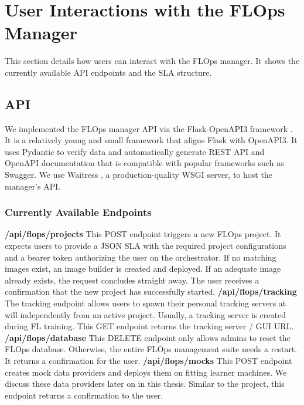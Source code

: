 \section{User Interactions with the FLOps Manager}
This section details how users can interact with the FLOps manager.
It shows the currently available API endpoints and the SLA structure.

\subsection{API} \label{subsection:api}
We implemented the FLOps manager API via the Flask-OpenAPI3 framework \cite{framework:flask_openapi3}.
It is a relatively young and small framework that aligns Flask with OpenAPI3.
It uses Pydantic to verify data and automatically generate REST API and OpenAPI documentation that is compatible with popular frameworks such as Swagger.
We use Waitress \cite{waitress}, a production-quality WSGI server, to host the manager's API.

\subsubsection{Currently Available Endpoints}
\textbf{/api/flops/projects}\newline
This POST endpoint triggers a new FLOps project.
It expects users to provide a JSON SLA with the required project configurations and a bearer token authorizing the user on the orchestrator.
If no matching images exist, an image builder is created and deployed.
If an adequate image already exists, the request concludes straight away.
The user receives a confirmation that the new project has successfully started.
\vspace{5mm}
\newline
\textbf{/api/flops/tracking}\newline
The tracking endpoint allows users to spawn their personal tracking servers at will independently from an active project.
Usually, a tracking server is created during FL training.
This GET endpoint returns the tracking server / GUI URL.
\vspace{5mm}
\newline
\textbf{/api/flops/database}\newline
This DELETE endpoint only allows admins to reset the FLOps database.
Otherwise, the entire FLOps management suite needs a restart.
It returns a confirmation for the user.
\vspace{5mm}
\newline
\textbf{/api/flops/mocks}\newline
This POST endpoint creates mock data providers and deploys them on fitting learner machines.
We discuss these data providers later on in this thesis.
Similar to the project, this endpoint returns a confirmation to the user.
\vspace{5mm}
\newline


